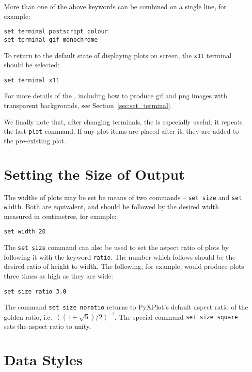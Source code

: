 More than one of the above keywords can be combined on a single line, for
example:

\begin{verbatim}
set terminal postscript colour
set terminal gif monochrome
\end{verbatim}

To return to the default state of displaying plots on screen, the {\tt x11}
terminal should be selected:

\begin{verbatim}
set terminal x11
\end{verbatim}

For more details of the , including how to produce gif
and png images with transparent backgrounds, see
Section~\ref{sec:set_terminal}.

We finally note that, after changing terminals, the  is
especially useful; it repeats the last {\tt plot} command. If any plot items
are placed after it, they are added to the pre-existing plot.

\section{Setting the Size of Output}

The widths of plots may be set be means of two commands -- {\tt set
size} and {\tt set width}. Both are
equivalent, and should be followed by the desired width measured in
centimetres, for example:

\begin{verbatim}
set width 20
\end{verbatim}

The {\tt set size} command can also be used to set the aspect ratio of plots by
following it with the keyword {\tt ratio}. The number
which follows should be the desired ratio of height to width. The following,
for example, would produce plots three times as high as they are wide:

\begin{verbatim}
set size ratio 3.0
\end{verbatim}

\noindent The command {\tt set size noratio} returns to PyXPlot's default
aspect ratio of the golden ratio, i.e.\ $\left((1+\sqrt{5})/2\right)^{-1}$. The
special command {\tt set size square} sets the aspect
ratio to unity.

\section{Data Styles}

